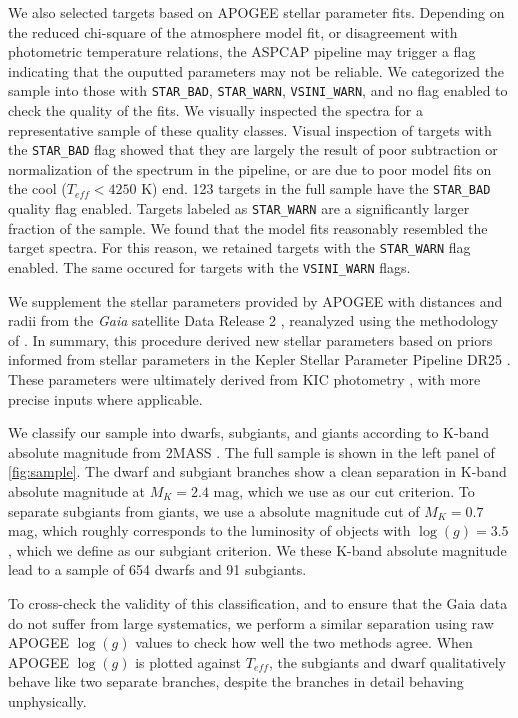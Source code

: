 \documentclass[manuscript]{aastex6}
\newcommand{\Gaia}{\mbox{\textit{Gaia}}}
\newcommand{\Teff}{\ensuremath{T_{eff}}}
\newcommand{\logg}{\ensuremath{\log(g)}}
\newcommand{\STARBAD}{\texttt{STAR\_BAD}}
\newcommand{\STARWARN}{\texttt{STAR\_WARN}}
\newcommand{\VSINIWARN}{\texttt{VSINI\_WARN}}
\newcommand{\gvs}{\authorcomment1}
\begin{document}
We also selected targets based on APOGEE stellar parameter fits.
Depending on the reduced chi-square of the atmosphere model fit, or
disagreement with photometric temperature relations, the ASPCAP pipeline
may trigger a flag indicating that the ouputted parameters may not be
reliable. We categorized the sample into those with \STARBAD, \STARWARN,
\VSINIWARN{}, and no flag enabled to check the quality of the fits. We
visually inspected the spectra for a representative sample of these
quality classes. 
Visual inspection of targets with the \STARBAD{} flag showed that they are 
largely the result of poor subtraction or normalization of the spectrum in the
pipeline, or are due to poor model fits on the cool (\(\Teff < 4250\) K) end. 
123 targets in the full sample have the \STARBAD{} quality flag enabled. 
Targets labeled as \STARWARN{} are a significantly larger fraction of the 
sample. We found that the model fits reasonably resembled the target spectra. 
For this reason, we retained targets with the \STARWARN{} flag enabled. The 
same occured for targets with the \VSINIWARN{} flags.

We supplement the stellar parameters provided by APOGEE with distances and radii from the 
\Gaia{} satellite \citep{Gaia16} Data Release 2 \citep{Gaia18}, reanalyzed 
using the methodology of \citet{Huber14} \citep{Berger18}. In summary, this
procedure derived new stellar parameters based on priors informed from stellar
parameters in the Kepler Stellar Parameter Pipeline DR25 \citep{Mathur17}.
These parameters were ultimately derived from KIC photometry \citep{Brown11},
with more precise inputs where applicable.

We classify our sample into dwarfs, subgiants, and giants according to
K-band absolute magnitude from 2MASS \citep{Skrutskie06}. The full sample is
shown in the left panel of \cref{fig:sample}. The dwarf and subgiant branches
show a clean separation in K-band absolute magnitude at \(M_K = 2.4\) mag,
which we use as our cut criterion. To separate subgiants from giants, we use a
absolute magnitude cut of \(M_K = 0.7\) mag, which roughly corresponds to the
luminosity of objects with \(\logg = 3.5\), which we define as our subgiant
criterion. We these K-band absolute magnitude lead to a sample of 654 dwarfs 
and 91 subgiants. \gvs{Check this}

To cross-check the validity of this classification, and to ensure that the Gaia
data do not suffer from large systematics, we perform a similar separation
using raw APOGEE \logg{} values to check how well the two methods agree. When
APOGEE \logg{} is plotted against \Teff{}, the subgiants and dwarf
qualitatively behave like two separate branches, despite the branches in detail
behaving unphysically.
\end{document}
